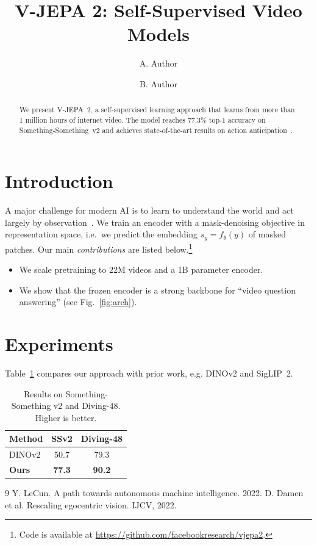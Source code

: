 \documentclass{article}
\title{V-JEPA 2: Self-Supervised Video Models}
\author{A. Author \and B. Author}
\newcommand{\method}{V-JEPA~2}
\begin{document}
\maketitle

\begin{abstract}
We present \method{}, a self-supervised learning approach that learns from more than 1 million hours of internet video. %
The model reaches 77.3\% top-1 accuracy on Something-Something~v2 and achieves state-of-the-art results on action anticipation~\cite{damen2022}.
\end{abstract}

\section{Introduction}
\label{sec:intro}
A major challenge for modern AI is to learn to understand the world and act largely by observation~\cite{lecun2022}.
We train an encoder with a mask-denoising objective in representation space, i.e.\ we predict the embedding $s_y = f_\theta(y)$ of masked patches.
Our main \emph{contributions} are listed below.\footnote{Code is available at \url{https://github.com/facebookresearch/vjepa2}.}

\begin{itemize}
  \item We scale pretraining to 22M videos and a 1B parameter encoder.
  \item We show that the frozen encoder is a strong backbone for ``video question answering'' (see Fig.~\ref{fig:arch}).
\end{itemize}

\section{Experiments}
Table~\ref{tab:main} compares our approach with prior work, e.g. DINOv2 and SigLIP~2.
\begin{table}[t]
  \centering
  \caption{Results on Something-Something v2 and Diving-48. Higher is better.}
  \label{tab:main}
  \begin{tabular}{lcc}
    \toprule
    Method & SSv2 & Diving-48 \\
    \midrule
    DINOv2 & 50.7 & 79.3 \\
    \textbf{Ours} & \textbf{77.3} & \textbf{90.2} \\
    \bottomrule
  \end{tabular}
\end{table}

\begin{thebibliography}{9}
 Y. LeCun. A path towards autonomous machine intelligence. 2022.
 D. Damen et al. Rescaling egocentric vision. IJCV, 2022.
\end{thebibliography}
\end{document}
